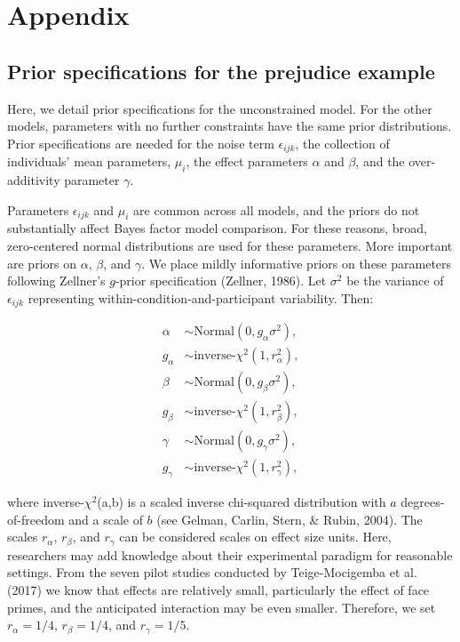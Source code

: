 \documentclass[english,,man]{apa6}
\begin{document}
\endgroup

\newpage

\hypertarget{appendix}{%
\section{Appendix}\label{appendix}}

\hypertarget{prior-specifications-for-the-prejudice-example}{%
\subsection{Prior specifications for the prejudice example}\label{prior-specifications-for-the-prejudice-example}}

Here, we detail prior specifications for the unconstrained model. For the other models, parameters with no further constraints have the same prior distributions. Prior specifications are needed for the noise term \(\epsilon_{ijk}\), the collection of individuals' mean parameters, \(\mu_{i}\), the effect parameters \(\alpha\) and \(\beta\), and the over-additivity parameter \(\gamma\).

Parameters \(\epsilon_{ijk}\) and \(\mu_{i}\) are common across all models, and the priors do not substantially affect Bayes factor model comparison. For these reasons, broad, zero-centered normal distributions are used for these parameters. More important are priors on \(\alpha\), \(\beta\), and \(\gamma\). We place mildly informative priors on these parameters following Zellner's \(g\)-prior specification (Zellner, 1986). Let \(\sigma^2\) be the variance of \(\epsilon_{ijk}\) representing within-condition-and-participant variability. Then:

\[
\begin{aligned}
\alpha & \sim \mbox{Normal}(0,g_{\alpha}\sigma^2),\\
g_\alpha & \sim \mbox{inverse-$\chi^2$}(1,r^2_\alpha),\\
\beta & \sim \mbox{Normal}(0,g_{\beta}\sigma^2),\\
g_\beta & \sim \mbox{inverse-$\chi^2$}(1,r^2_\beta),\\
\gamma & \sim \mbox{Normal}(0,g_{\gamma}\sigma^2),\\
g_\gamma & \sim \mbox{inverse-$\chi^2$}(1,r^2_\gamma),
\end{aligned}
\]

where inverse-\(\chi^2\)(a,b) is a scaled inverse chi-squared distribution with \(a\) degrees-of-freedom and a scale of \(b\) (see Gelman, Carlin, Stern, \& Rubin, 2004). The scales \(r_\alpha\), \(r_\beta\), and \(r_\gamma\) can be considered scales on effect size units. Here, researchers may add knowledge about their experimental paradigm for reasonable settings. From the seven pilot studies conducted by Teige-Mocigemba et al. (2017) we know that effects are relatively small, particularly the effect of face primes, and the anticipated interaction may be even smaller. Therefore, we set \(r_\alpha = 1/4\), \(r_\beta = 1/4\), and \(r_\gamma = 1/5\).
\end{document}
